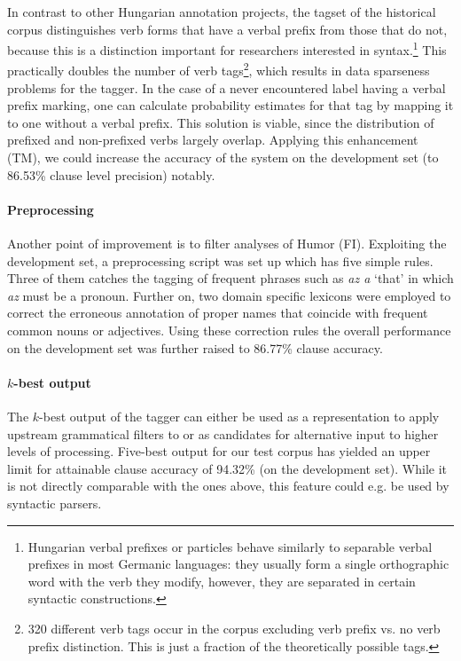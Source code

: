 In contrast to other Hungarian annotation projects, the tagset of the historical corpus distinguishes verb forms that have a verbal prefix from those that do not, because this is a distinction important for researchers interested in syntax.\footnote{Hungarian verbal prefixes or particles behave similarly to separable verbal prefixes in most Germanic languages: they usually form a single orthographic word with the verb they modify, however, they are separated in certain syntactic constructions.} 
This practically doubles the number of verb tags\footnote{320 different verb tags occur in the corpus excluding verb prefix vs. no verb prefix distinction. This is just a fraction of the theoretically possible tags.}, which results in data sparseness problems for the tagger. 
In the case of a never encountered label having a verbal prefix marking, one can calculate probability estimates for that tag by mapping it to one without a verbal prefix. 
This solution is viable, since the distribution of prefixed and non-prefixed verbs largely overlap. 
Applying this enhancement (TM), we could increase the accuracy of the system on the development set (to 86.53\% clause level precision) notably.

\paragraph{Preprocessing}

Another point of improvement is to filter analyses of Humor (FI). 
Exploiting the development set, a preprocessing script was set up which has five simple rules. 
Three of them catches the tagging of frequent phrases such as \emph{az a} `that' in which \emph{az} must be a pronoun. 
Further on, two domain specific lexicons were employed to correct the erroneous annotation of proper names that coincide with frequent common nouns or adjectives. 
Using these correction rules the overall performance on the development set was further raised to 86.77\% clause accuracy.



\paragraph{$k$-best output}
The $k$-best output of the tagger can either be used as a representation to apply upstream grammatical filters to or as candidates for alternative input to higher levels of processing. 
Five-best output for our test corpus has yielded an upper limit for attainable clause accuracy of 94.32\% (on the development set). 
While it is not directly comparable with the ones above, this feature could e.g. be used by syntactic parsers.


